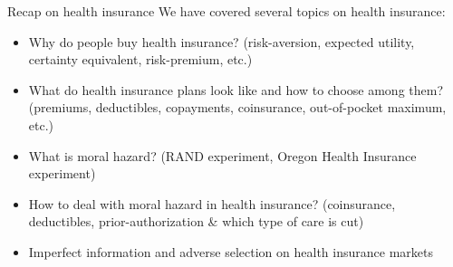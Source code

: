 \begin{frame}{Recap on health insurance}
    We have covered several topics on health insurance:
    \begin{itemize}
        \item Why do people buy health insurance? {\footnotesize {\color{gray} (risk-aversion, expected utility, certainty equivalent, risk-premium, etc.)}} \pause
        \item What do health insurance plans look like and how to choose among them? {\footnotesize {\color{gray} (premiums, deductibles, copayments, coinsurance, out-of-pocket maximum, etc.)}} \pause
        \item What is moral hazard? {\footnotesize {\color{gray} (RAND experiment, Oregon Health Insurance experiment)}} \pause
        \item How to deal with moral hazard in health insurance? {\footnotesize {\color{gray} (coinsurance, deductibles, prior-authorization \& which type of care is cut)}} \pause
        \item Imperfect information and adverse selection on health insurance markets
    \end{itemize}

\end{frame}
